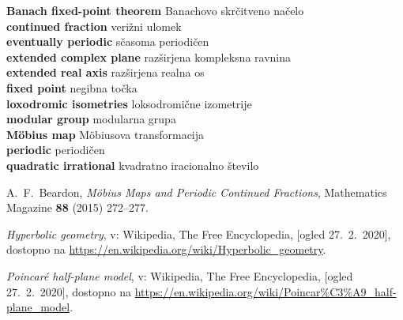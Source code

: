 \documentclass[a4paper,12pt]{article}
\newcommand{\geslo}[2]{\noindent\textbf{#1} \quad \hangindent=1cm #2\\[-1pc]}
\begin{document}
\geslo{Banach fixed-point theorem}{Banachovo skrčitveno načelo}

\geslo{continued fraction}{verižni ulomek}

\geslo{eventually periodic}{sčasoma periodičen}

\geslo{extended complex plane}{razširjena kompleksna ravnina}

\geslo{extended real axis}{razširjena realna os}

\geslo{fixed point}{negibna točka}

\geslo{loxodromic isometries}{loksodromične izometrije}

\geslo{modular group}{modularna grupa}

\geslo{M\"obius map}{M\"obiusova transformacija}

\geslo{periodic}{periodičen}

\geslo{quadratic irrational}{kvadratno iracionalno število}



\begin{thebibliography}{1}

A.~F.~Beardon, \emph{M\"obius Maps and Periodic Continued Fractions}, Mathematics Magazine \textbf{88} (2015) 272--277.

\emph{Hyperbolic geometry}, v: Wikipedia, The Free Encyclopedia, [ogled 27.~2.~2020], dostopno na \url{https://en.wikipedia.org/wiki/Hyperbolic_geometry}.

\emph{Poincar\'e half-plane model}, v: Wikipedia, The Free Encyclopedia, [ogled 27.~2.~2020], dostopno na \url{https://en.wikipedia.org/wiki/Poincar%C3%A9_half-plane_model}. 

\end{thebibliography}
\end{document}
